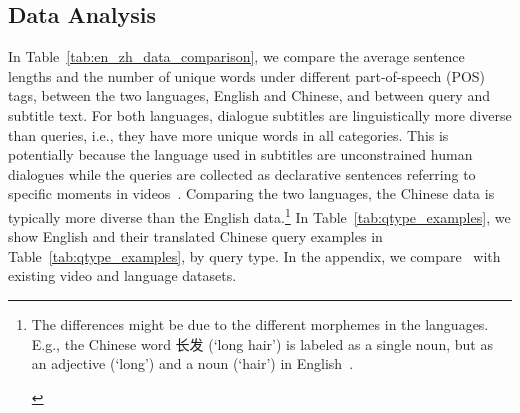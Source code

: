 \begin{table}[!t]
\centering
\small
\setlength{\tabcolsep}{2pt}
\renewcommand{\arraystretch}{1.3}
\caption{
\DsetName~English and Chinese query examples in different query types. 
The percentage of the queries in each query type is shown in brackets.
}
\label{tab:qtype_examples}
\end{table}


\subsection{Data Analysis}
In Table~\ref{tab:en_zh_data_comparison}, we compare the average sentence lengths and the number of unique words under different part-of-speech (POS) tags, between the two languages, English and Chinese, and between query and subtitle text.
For both languages, dialogue subtitles are linguistically more diverse than queries, i.e., they have more unique words in all categories. 
This is potentially because the language used in subtitles are unconstrained human dialogues while the queries are collected as declarative sentences referring to specific moments in videos~\cite{lei2020tvr}. 
Comparing the two languages, the Chinese data is typically more diverse than the English data.\footnote{
\begin{CJK*}{UTF8}{gbsn}
The differences might be due to the different morphemes in the languages.
E.g., the Chinese word 长发\; (`long hair') is labeled as a single noun, but as an adjective (`long') and a noun (`hair') in English~\cite{wang2019vatex}.
\end{CJK*}
}
In Table~\ref{tab:qtype_examples}, we show English and their translated Chinese query examples in Table~\ref{tab:qtype_examples}, by query type.
In the appendix, we compare \DsetName~with existing video and language datasets.






